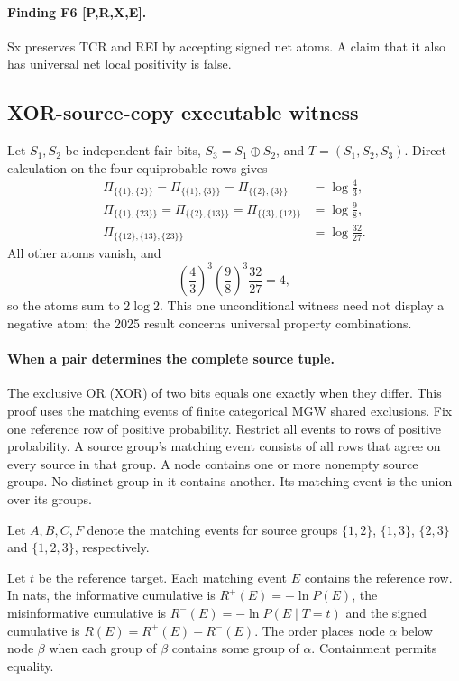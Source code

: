 \documentclass[11pt]{article}
\newcommand{\evidence}[1]{\textbf{[#1]}}
\begin{document}
\paragraph{Finding F6 \evidence{P,R,X,E}.}
Sx preserves TCR and REI by accepting signed net atoms.  A claim that it also
has universal net local positivity is false.

\subsection{XOR-source-copy executable witness}

Let $S_1,S_2$ be independent fair bits, $S_3=S_1\oplus S_2$, and
$T=(S_1,S_2,S_3)$.  Direct calculation on the four equiprobable rows gives
\begin{align}
\Pi_{\{\{1\},\{2\}\}}
=\Pi_{\{\{1\},\{3\}\}}
=\Pi_{\{\{2\},\{3\}\}}&=\log\frac43,\\
\Pi_{\{\{1\},\{23\}\}}
=\Pi_{\{\{2\},\{13\}\}}
=\Pi_{\{\{3\},\{12\}\}}&=\log\frac98,\\
\Pi_{\{\{12\},\{13\},\{23\}\}}&=\log\frac{32}{27}.
\end{align}
All other atoms vanish, and
\[
\left(\frac43\right)^3\left(\frac98\right)^3\frac{32}{27}=4,
\]
so the atoms sum to $2\log2$.  This one unconditional witness need not display
a negative atom; the 2025 result concerns universal property combinations.

\paragraph{When a pair determines the complete source tuple.}
The exclusive OR (XOR) of two bits equals one exactly when they differ.
This proof uses the matching events of finite categorical MGW shared exclusions.
Fix one reference row of positive probability. Restrict all events to rows of positive probability. A source
group's matching event consists of all rows that agree on every source in
that group. A node contains one or more nonempty source groups. No distinct
group in it contains another. Its matching event is the union over its groups.

Let $A,B,C,F$ denote
the matching events for source groups $\{1,2\}$, $\{1,3\}$, $\{2,3\}$ and
$\{1,2,3\}$, respectively.

Let $t$ be the reference target. Each matching
event $E$ contains the reference row. In nats, the informative cumulative
is $R^+(E)=-\ln P(E)$, the misinformative cumulative is
$R^-(E)=-\ln P(E\mid T=t)$ and the signed cumulative is
$R(E)=R^+(E)-R^-(E)$. The order places node $\alpha$ below node $\beta$ when each group of
$\beta$ contains some group of $\alpha$. Containment permits equality.
\end{document}
